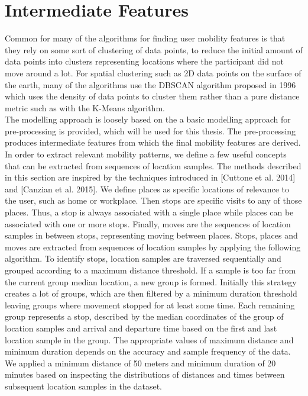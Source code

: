 \section{Intermediate Features}
Common for many of the algorithms for finding user mobility features is that they rely on some sort of clustering of data points, to reduce the initial amount of data points into clusters representing locations where the participant did not move around a lot. For spatial clustering such as 2D data points on the surface of the earth, many of the algorithms use the DBSCAN algorithm proposed in 1996  \cite{density-based-1996} which uses the density of data points to cluster them rather than a pure distance metric such as with the K-Means algorithm. \\

The modelling approach is loosely based on the \cite{sparse-location-2014} a basic modelling approach for pre-processing is provided, which will be used for this thesis. The pre-processing produces intermediate features from which the final mobility features are derived. \\

In order to extract relevant mobility patterns, we define a few useful concepts that can be extracted from sequences of location samples. The methods described in this section are inspired by the techniques introduced in [Cuttone et al. 2014] and [Canzian et al. 2015]. We define places as specific locations of relevance to the user, such as home or workplace. Then stops are specific visits to any of those places. Thus, a stop is always associated with a single place while places can be associated with one or more stops. Finally, moves are the sequences of location samples in between stops, representing moving between places. Stops, places and moves are extracted from sequences of location samples by applying the following algorithm. To identify stops, location samples are traversed sequentially and grouped according to a maximum distance threshold. If a sample is too far from the current group median location, a new group is formed. Initially this strategy creates a lot of groups, which are then filtered by a minimum duration threshold leaving groups where movement stopped for at least some time. Each remaining group represents a stop, described by the median coordinates of the group of location samples and arrival and departure time based on the first and last location sample in the group. The appropriate values of maximum distance and minimum duration depends on the accuracy and sample frequency of the data. We applied a minimum distance of 50 meters and minimum duration of 20 minutes based on inspecting the distributions of distances and times between subsequent location samples in the dataset.


